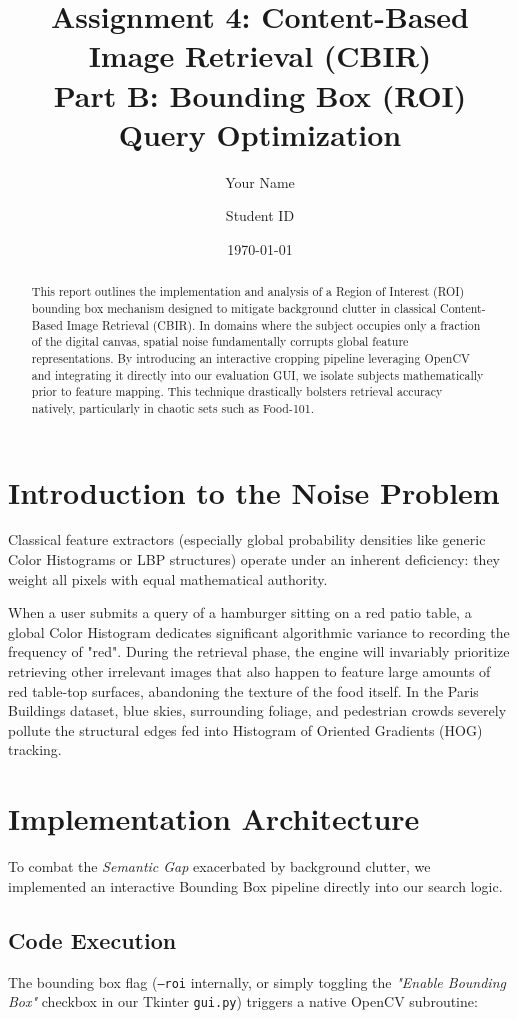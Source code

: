 \documentclass[11pt, a4paper]{article}
\title{Assignment 4: Content-Based Image Retrieval (CBIR) \\ \large Part B: Bounding Box (ROI) Query Optimization}
\author{Your Name \and Student ID}
\date{\today}
\begin{document}
\maketitle

\begin{abstract}
This report outlines the implementation and analysis of a Region of Interest (ROI) bounding box mechanism designed to mitigate background clutter in classical Content-Based Image Retrieval (CBIR). In domains where the subject occupies only a fraction of the digital canvas, spatial noise fundamentally corrupts global feature representations. By introducing an interactive cropping pipeline leveraging OpenCV and integrating it directly into our evaluation GUI, we isolate subjects mathematically prior to feature mapping. This technique drastically bolsters retrieval accuracy natively, particularly in chaotic sets such as Food-101.
\end{abstract}

\section{Introduction to the Noise Problem}
Classical feature extractors (especially global probability densities like generic Color Histograms or LBP structures) operate under an inherent deficiency: they weight all pixels with equal mathematical authority. 

When a user submits a query of a hamburger sitting on a red patio table, a global Color Histogram dedicates significant algorithmic variance to recording the frequency of "red". During the retrieval phase, the engine will invariably prioritize retrieving other irrelevant images that also happen to feature large amounts of red table-top surfaces, abandoning the texture of the food itself. In the Paris Buildings dataset, blue skies, surrounding foliage, and pedestrian crowds severely pollute the structural edges fed into Histogram of Oriented Gradients (HOG) tracking.

\section{Implementation Architecture}
To combat the \textit{Semantic Gap} exacerbated by background clutter, we implemented an interactive Bounding Box pipeline directly into our search logic. 

\subsection{Code Execution}
The bounding box flag (\texttt{--roi} internally, or simply toggling the \textit{"Enable Bounding Box"} checkbox in our Tkinter \texttt{gui.py}) triggers a native OpenCV subroutine:
\end{document}
